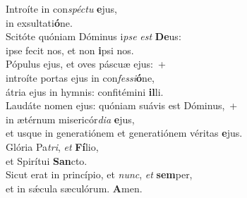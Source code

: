 \evenverse Introíte in con\textit{spé}\textit{ctu} \textbf{e}jus,~\*\\
\evenverse in exsultati\textbf{ó}ne.\\
\oddverse Scitóte quóniam Dóminus i\textit{pse} \textit{est} \textbf{De}us:~\*\\
\oddverse ipse fecit nos, et non \textbf{i}psi nos.\\
\evenverse Pópulus ejus, et oves páscuæ ejus:~+\\
\evenverse  introíte portas ejus in con\textit{fes}\textit{si}\textbf{ó}ne,~\*\\
\evenverse átria ejus in hymnis: confitémini \textbf{il}li.\\
\oddverse Laudáte nomen ejus: quóniam suávis est Dóminus,~+\\
\oddverse  in ætérnum misericór\textit{di}\textit{a} \textbf{e}jus,~\*\\
\oddverse et usque in generatiónem et generatiónem véritas \textbf{e}jus.\\
\evenverse Glória Pa\textit{tri}, \textit{et} \textbf{Fí}lio,~\*\\
\evenverse et Spirítui \textbf{San}cto.\\
\oddverse Sicut erat in princípio, et \textit{nunc}, \textit{et} \textbf{sem}per,~\*\\
\oddverse et in sǽcula sæculórum. \textbf{A}men.\\
